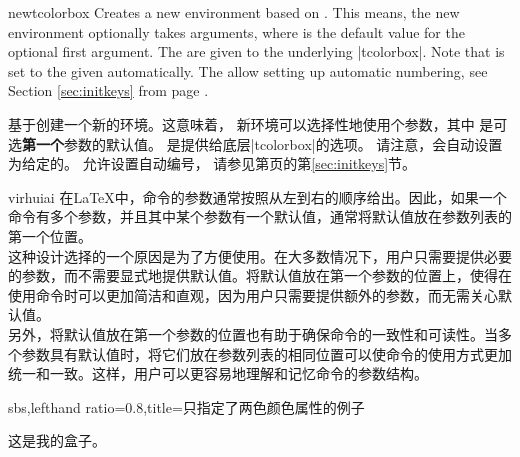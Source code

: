 \begin{docCommand}{newtcolorbox}{}
Creates a new environment  based on .
This means,
the new environment  optionally takes  arguments, where
 is the default value for the optional first argument.
The  are given to the underlying |tcolorbox|.
Note that  is set to the given 
automatically.
The  allow setting up automatic numbering,
see Section \ref{sec:initkeys} from page \pageref{sec:initkeys}.


基于创建一个新的环境。这意味着， 新环境可以选择性地使用个参数，其中 是可选{\bf 第一个}参数的默认值。 是提供给底层|tcolorbox|的选项。 请注意，会自动设置为给定的。 允许设置自动编号， 请参见第\pageref{sec:initkeys}页的第\ref{sec:initkeys}节。

\begin{引述之言}{virhuiai}
在\LaTeX 中，命令的参数通常按照从左到右的顺序给出。因此，如果一个命令有多个参数，并且其中某个参数有一个默认值，通常将默认值放在参数列表的第一个位置。
\\[0.5em]
这种设计选择的一个原因是为了方便使用。在大多数情况下，用户只需要提供必要的参数，而不需要显式地提供默认值。将默认值放在第一个参数的位置上，使得在使用命令时可以更加简洁和直观，因为用户只需要提供额外的参数，而无需关心默认值。
\\[0.5em]
另外，将默认值放在第一个参数的位置也有助于确保命令的一致性和可读性。当多个参数具有默认值时，将它们放在参数列表的相同位置可以使命令的使用方式更加统一和一致。这样，用户可以更容易地理解和记忆命令的参数结构。
\end{引述之言}

\begin{dispExample*}{sbs,lefthand ratio=0.8,title=只指定了两色颜色属性的例子}
\begin{mybox}
这是我的盒子。
\end{mybox}
\end{dispExample*}


\end{docCommand}
